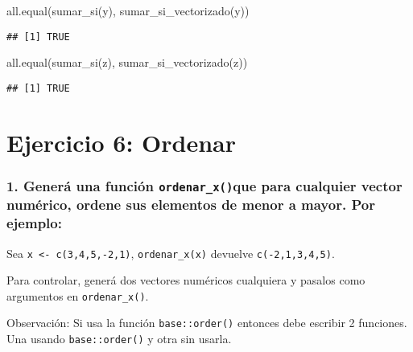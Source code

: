 \documentclass[
]{article}
\newenvironment{Shaded}{\begin{snugshade}}{\end{snugshade}}
\newcommand{\FunctionTok}[1]{\textcolor[rgb]{0.00,0.00,0.00}{#1}}
\newcommand{\NormalTok}[1]{#1}
\begin{document}
\begin{Shaded}
\begin{Highlighting}[]
\FunctionTok{all.equal}\NormalTok{(}\FunctionTok{sumar\_si}\NormalTok{(y), }\FunctionTok{sumar\_si\_vectorizado}\NormalTok{(y))}
\end{Highlighting}
\end{Shaded}

\begin{verbatim}
## [1] TRUE
\end{verbatim}

\begin{Shaded}
\begin{Highlighting}[]
\FunctionTok{all.equal}\NormalTok{(}\FunctionTok{sumar\_si}\NormalTok{(z), }\FunctionTok{sumar\_si\_vectorizado}\NormalTok{(z))}
\end{Highlighting}
\end{Shaded}

\begin{verbatim}
## [1] TRUE
\end{verbatim}

\hypertarget{ejercicio-6-ordenar}{%
\section{Ejercicio 6: Ordenar}\label{ejercicio-6-ordenar}}

\hypertarget{generuxe1-una-funciuxf3n-ordenar_xque-para-cualquier-vector-numuxe9rico-ordene-sus-elementos-de-menor-a-mayor.-por-ejemplo}{%
\subsubsection{\texorpdfstring{1. Generá una función
\texttt{ordenar\_x()}que para cualquier vector numérico, ordene sus
elementos de menor a mayor. Por
ejemplo:}{1. Generá una función ordenar\_x()que para cualquier vector numérico, ordene sus elementos de menor a mayor. Por ejemplo:}}\label{generuxe1-una-funciuxf3n-ordenar_xque-para-cualquier-vector-numuxe9rico-ordene-sus-elementos-de-menor-a-mayor.-por-ejemplo}}

Sea \texttt{x\ \textless{}-\ c(3,4,5,-2,1)}, \texttt{ordenar\_x(x)}
devuelve \texttt{c(-2,1,3,4,5)}.

Para controlar, generá dos vectores numéricos cualquiera y pasalos como
argumentos en \texttt{ordenar\_x()}.

Observación: Si usa la función \texttt{base::order()} entonces debe
escribir 2 funciones. Una usando \texttt{base::order()} y otra sin
usarla.
\end{document}
